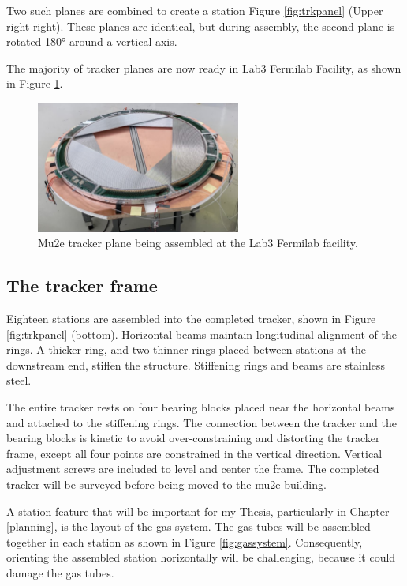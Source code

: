 Two such planes are combined to create a station Figure \ref{fig:trkpanel} (Upper right-right). 
These planes are identical, but during assembly, the second plane 
is rotated 180° around a vertical axis. 

The majority of tracker planes are now ready in Lab3 Fermilab Facility, as shown in Figure \ref{fig:trueplane}.

\begin{figure}[!h]
    \centering
    \includegraphics[width =0.6\textwidth]{figures/png/Screenshot_20240706_163056.png}
    \caption{Mu2e tracker plane being assembled at the Lab3 Fermilab facility.}
    \label{fig:trueplane}
\end{figure}
\subsection{The tracker frame}

Eighteen stations are assembled into the completed tracker, shown in Figure \ref{fig:trkpanel} 
(bottom). Horizontal beams maintain longitudinal alignment of the rings. 
A thicker ring, and two thinner rings placed between 
stations at the downstream end, stiffen the structure. 
Stiffening rings and beams are stainless steel.

The entire tracker rests on four bearing blocks placed near 
the horizontal beams and attached to the stiffening rings. 
The connection between the tracker and the bearing blocks is 
kinetic to avoid over-constraining and distorting the tracker 
frame, except all four points are constrained in the vertical 
direction. Vertical adjustment screws are included to level and center the frame. 
The completed tracker will be surveyed before being moved to the mu2e building. 

A station feature that will be important for my Thesis, particularly in 
Chapter \ref{planning}, is the layout of the gas system. 
The gas tubes will be assembled together in each station as shown in Figure 
\ref{fig:gassystem}. Consequently, orienting the assembled station horizontally 
will be challenging, because it could damage the gas tubes.

